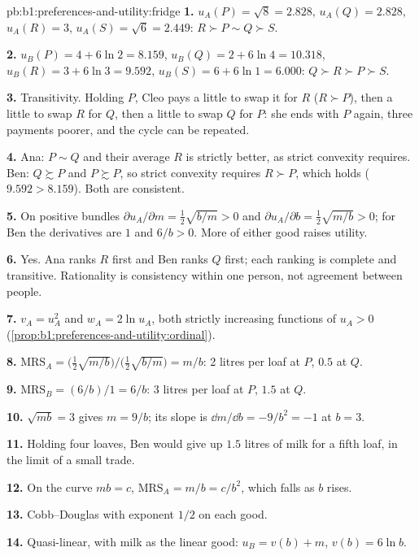 \begin{solution}{pb:b1:preferences-and-utility:fridge}
\textbf{1.} $u_A(P) = \sqrt 8 = 2.828$, $u_A(Q) = 2.828$, $u_A(R) = 3$,
$u_A(S) = \sqrt 6 = 2.449$: $R \succ P \sim Q \succ S$.

\textbf{2.} $u_B(P) = 4 + 6\ln 2 = 8.159$, $u_B(Q) = 2 + 6\ln 4 = 10.318$,
$u_B(R) = 3 + 6\ln 3 = 9.592$, $u_B(S) = 6 + 6\ln 1 = 6.000$: $Q \succ R \succ P \succ S$.

\textbf{3.} Transitivity. Holding $P$, Cleo pays a little to swap it for $R$
($R \succ P$), then a little to swap $R$ for $Q$, then a little to swap $Q$ for
$P$: she ends with $P$ again, three payments poorer, and the cycle can be
repeated.

\textbf{4.} Ana: $P \sim Q$ and their average $R$ is strictly better, as strict
convexity requires. Ben: $Q \succsim P$ and $P \succsim P$, so strict convexity
requires $R \succ P$, which holds ($9.592 > 8.159$). Both are consistent.

\textbf{5.} On positive bundles $\partial u_A/\partial m = \tfrac12\sqrt{b/m} > 0$ and
$\partial u_A/\partial b = \tfrac12\sqrt{m/b} > 0$; for Ben the derivatives are
$1$ and $6/b > 0$. More of either good raises utility.

\textbf{6.} Yes. Ana ranks $R$ first and Ben ranks $Q$ first; each ranking is
complete and transitive. Rationality is consistency within one person, not
agreement between people.

\textbf{7.} $v_A = u_A^2$ and $w_A = 2\ln u_A$, both strictly increasing
functions of $u_A > 0$ (\cref{prop:b1:preferences-and-utility:ordinal}).

\textbf{8.} $\mathrm{MRS}_A = \bigl(\tfrac12\sqrt{m/b}\bigr)/\bigl(\tfrac12\sqrt{b/m}\bigr) = m/b$:
2 litres per loaf at $P$, $0.5$ at $Q$.

\textbf{9.} $\mathrm{MRS}_B = (6/b)/1 = 6/b$: 3 litres per loaf at $P$, $1.5$ at $Q$.

\textbf{10.} $\sqrt{mb} = 3$ gives $m = 9/b$; its slope is $\dd m/\dd b = -9/b^2 = -1$ at $b = 3$.

\textbf{11.} Holding four loaves, Ben would give up $1.5$ litres of milk for a
fifth loaf, in the limit of a small trade.

\textbf{12.} On the curve $mb = c$, $\mathrm{MRS}_A = m/b = c/b^2$, which falls as
$b$ rises.

\textbf{13.} Cobb--Douglas with exponent $1/2$ on each good.

\textbf{14.} Quasi-linear, with milk as the linear good: $u_B = v(b) + m$, $v(b) = 6\ln b$.


\end{solution}
